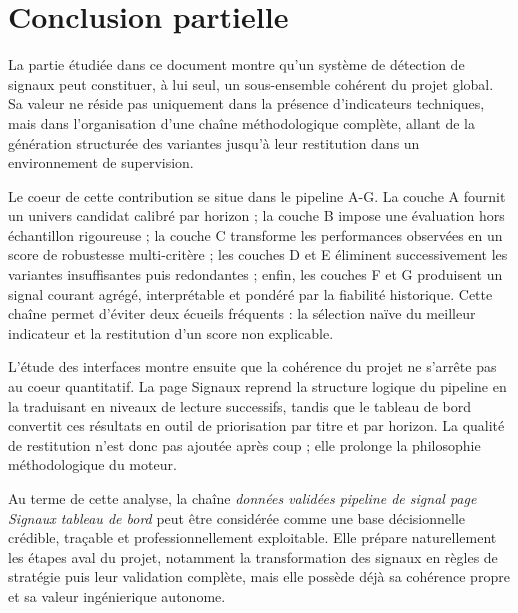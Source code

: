 \chapter{Conclusion partielle}

La partie étudiée dans ce document montre qu'un système de détection de signaux
peut constituer, à lui seul, un sous-ensemble cohérent du projet global. Sa
valeur ne réside pas uniquement dans la présence d'indicateurs techniques, mais
dans l'organisation d'une chaîne méthodologique complète, allant de la génération
structurée des variantes jusqu'à leur restitution dans un environnement de
supervision.

Le coeur de cette contribution se situe dans le pipeline A-G. La couche A fournit
un univers candidat calibré par horizon ; la couche B impose une évaluation hors
échantillon rigoureuse ; la couche C transforme les performances observées en un
score de robustesse multi-critère ; les couches D et E éliminent successivement
les variantes insuffisantes puis redondantes ; enfin, les couches F et G
produisent un signal courant agrégé, interprétable et pondéré par la fiabilité
historique. Cette chaîne permet d'éviter deux écueils fréquents : la sélection
naïve du meilleur indicateur et la restitution d'un score non explicable.

L'étude des interfaces montre ensuite que la cohérence du projet ne s'arrête pas
au coeur quantitatif. La page Signaux reprend la structure logique du pipeline en
la traduisant en niveaux de lecture successifs, tandis que le tableau de bord
convertit ces résultats en outil de priorisation par titre et par horizon. La
qualité de restitution n'est donc pas ajoutée après coup ; elle prolonge la
philosophie méthodologique du moteur.

Au terme de cette analyse, la chaîne
\textit{données validées \rightarrow pipeline de signal \rightarrow page
Signaux \rightarrow tableau de bord}
peut être considérée comme une base décisionnelle crédible, traçable et
professionnellement exploitable. Elle prépare naturellement les étapes aval du
projet, notamment la transformation des signaux en règles de stratégie puis leur
validation complète, mais elle possède déjà sa cohérence propre et sa valeur
ingénierique autonome.
